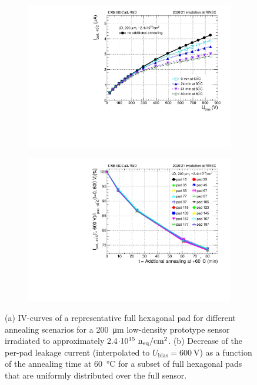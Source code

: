 \begin{figure}
	\captionsetup[subfigure]{aboveskip=-1pt,belowskip=-1pt}
	\centering
	\begin{subfigure}[b]{0.49\textwidth}
		\includegraphics[width=0.999\textwidth]{plots/annealing_iv/annealing_IV_ch24.pdf}
		\subcaption{
		}
		\label{plot:annealing_IV}
	\end{subfigure}
	\hfill
	\begin{subfigure}[b]{0.49\textwidth}
		\includegraphics[width=0.999\textwidth]{plots/annealing_iv/annealing_current.pdf}
		\subcaption{
		}
		\label{plot:annealing_current}
	\end{subfigure}    

	\caption{
		(a) IV-curves of a representative full hexagonal pad for different annealing scenarios for a \SI{200}{\micro\metre} low-density prototype sensor irradiated to approximately 2.4$\cdot 10^{15}~\mathrm{n_{eq}}/\mathrm{cm}^{2}$.
        (b) Decrease of the per-pad leakage current (interpolated to $U_\text{bias}=\SI{600}{\volt}$) as a function of the annealing time at \SI{60}{\celsius} for a subset of full hexagonal pads that are uniformly distributed over the full sensor.
	}
\end{figure}
